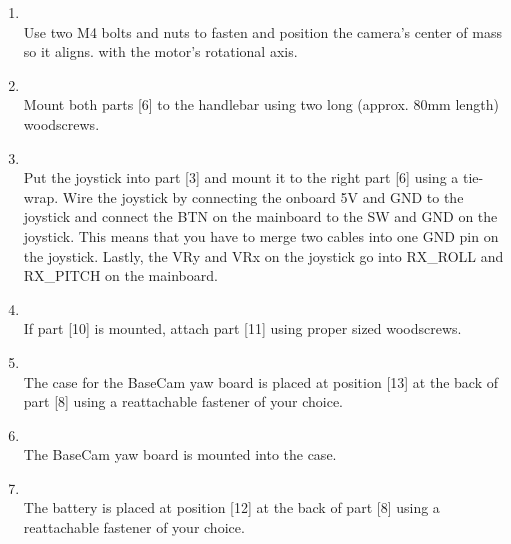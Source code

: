 \begin{enumerate}[label=\bfseries Step \arabic*]
\item \hfill \\
Use two M4 bolts and nuts to fasten and position the camera’s center of mass so it aligns.
with the motor’s rotational axis.
\item \hfill \\
Mount both parts [6] to the handlebar using two long (approx. 80mm length) woodscrews.
\item \hfill \\
Put the joystick into part [3] and mount it to the right part [6] using a tie-wrap. Wire the joystick by connecting the onboard 5V and GND to the joystick and connect the BTN on the mainboard to the SW and GND on the joystick. This means that you have to merge two cables into one GND pin on the joystick. Lastly, the VRy and VRx on the joystick go into RX\_ROLL and RX\_PITCH on the mainboard.
\item \hfill \\
If part [10] is mounted, attach part [11] using proper sized woodscrews.
\item \hfill \\
The case for the BaseCam yaw board is placed at position [13] at the back of part [8] using a reattachable fastener of your choice.
\item \hfill \\
The BaseCam yaw board is mounted into the case.
\item \hfill \\
The battery is placed at position [12] at the back of part [8] using a reattachable fastener of your choice.
\end{enumerate}